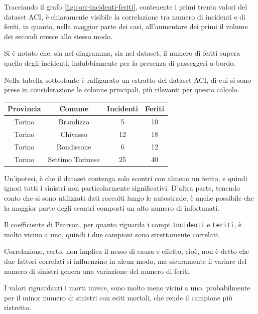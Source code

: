 \documentclass[a4paper,12pt]{report}
\newcommand{\columnstyle}[1]{\texttt{#1}}
\begin{document}
Tracciando il grafo \ref{fig:corr-incidenti-feriti}, contenente i primi trenta valori 
del dataset ACI, è chiaramente visibile la correlazione tra 
numero di incidenti e di feriti, in quanto, nella maggior parte dei casi, 
all'aumentare dei primi il volume dei secondi cresce allo stesso modo. 

Si è notato che, sia nel diagramma, sia nel dataset, il numero di feriti supera quello 
degli incidenti, indubbiamente per la presenza di passeggeri a bordo.

Nella tabella sottostante è raffigurato un estratto del dataset ACI, 
di cui si sono prese in considerazione le colonne principali, più 
rilevanti per questo calcolo. 

\begin{center}
    \def\arraystretch{1.5}%
    \begin{tabular}{ |c|c|c|c| } 
    \hline
    Provincia & Comune & Incidenti & Feriti \\ 
    \hline
    \rowcolor{TableGray}
    Torino & Brandizzo & 5 & 10\\
    Torino & Chivasso & 12 & 18\\
    \rowcolor{TableGray}
    Torino & Rondissone & 6 & 12\\
    Torino & Settimo Torinese & 25 & 40\\
    \hline
    \end{tabular}
\end{center}

Un'ipotesi, è che il dataset contenga solo scontri con almeno un ferito, 
e quindi ignori tutti i sinistri non particolarmente significativi. 
D'altra parte, tenendo conto che si sono utilizzati dati raccolti lungo 
le autostrade, è anche possibile che la maggior parte degli scontri comporti 
un alto numero di infortunati. 

Il coefficiente di Pearson, per quanto riguarda i campi \columnstyle{Incidenti} 
e \columnstyle{Feriti}, 
è molto vicino a uno, quindi i due campioni sono strettamente correlati. 

Correlazione, certo, non implica il nesso di causa e effetto, 
cioè, non è detto che due fattori correlati si influenzino in alcun modo,
ma sicuramente il variare del numero di sinistri genera una variazione del numero di feriti.

I valori riguardanti i morti invece, sono molto meno vicini a uno, probabilmente 
per il minor numero di sinistri con esiti mortali, che rende il campione più ristretto. 
\end{document}
